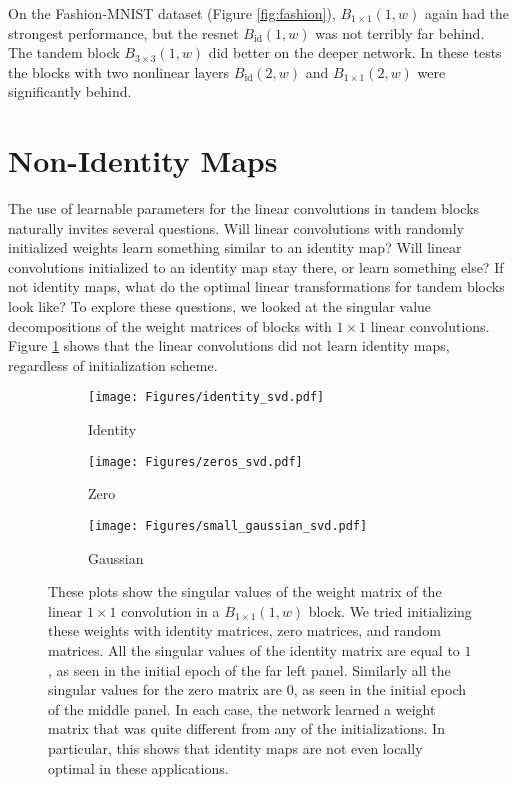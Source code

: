\documentclass{article} %
\begin{document}
On the Fashion-MNIST dataset (Figure \ref{fig:fashion}), $B_{1\times 1}(1,w)$ again had the strongest performance, but the resnet $B_{\operatorname{id}}(1,w)$ was not terribly far behind.
The tandem block $B_{3\times 3}(1,w)$ did better on the deeper network.  
In these tests the blocks with two nonlinear layers  $B_{\operatorname{id}}(2,w)$ and $B_{1\times 1}(2,w)$ were significantly behind.

\section{Non-Identity Maps}\label{nonid}

The use of learnable parameters for the linear convolutions in tandem blocks naturally invites several questions. Will linear convolutions with randomly initialized weights learn something similar to an identity map? Will linear convolutions initialized to an identity map stay there, or learn something else? If not identity maps, what do the optimal linear transformations for tandem blocks look like? To explore these questions, we looked at the singular value decompositions of the weight matrices of blocks with $1\times 1$ linear convolutions. Figure \ref{fig:svd} shows that the linear convolutions did not learn identity maps, regardless of initialization scheme.

\begin{figure}[htb]
	\centering
	\begin{subfigure}[t]{.3\linewidth}
		\centering
		\texttt{[image: Figures/identity\_svd.pdf]}
		\captionsetup{width=.8\linewidth}
		\caption*{Identity}
	\end{subfigure}
	\hspace{.025\linewidth}
	\begin{subfigure}[t]{.3\linewidth}
		\centering
		\texttt{[image: Figures/zeros\_svd.pdf]}
		\captionsetup{width=.8\linewidth}
		\caption*{Zero}
	\end{subfigure}
	\hspace{.025\linewidth}
	\begin{subfigure}[t]{.3\linewidth}
		\centering
		\texttt{[image: Figures/small\_gaussian\_svd.pdf]}
		\captionsetup{width=.8\linewidth}
		\caption*{Gaussian}
	\end{subfigure}
\caption{These plots show the singular values of the weight matrix of the linear $1\times 1$ convolution in a $B_{1\times 1}(1,w)$ block. 
We tried initializing these weights with identity matrices, zero matrices, and random matrices. All the singular values of the identity matrix are equal to $1$, as seen in the initial epoch of the far left panel. Similarly all the singular values for the zero matrix are $0$, as seen in the initial epoch of the middle panel.  
In each case, the network learned a weight matrix that was quite different from any of the initializations. In particular, this shows that identity maps are not even locally optimal in these applications.}\label{fig:svd}
\end{figure}
\end{document}

